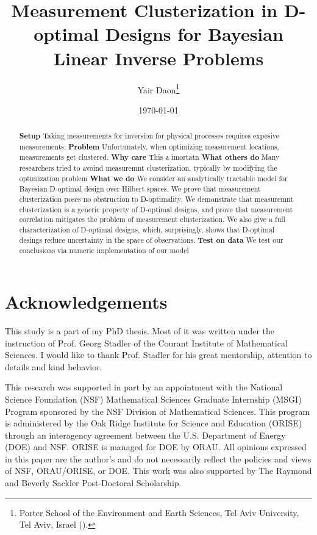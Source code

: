 \documentclass{siamonline220329}
\title{Measurement Clusterization in D-optimal Designs for Bayesian Linear
  Inverse Problems}
\author{Yair Daon\thanks{Porter School of the Environment and Earth
    Sciences, Tel Aviv University, Tel Aviv, Israel
    (\email{yair.daon@gmail.com}).}}
\date{\today}
\begin{document}
\maketitle
\begin{abstract}
  \textbf{Setup} Taking measurements for inversion for physical
  processes requires expesive measurements.  \textbf{Problem}
  Unfortunately, when optimizing measurement locations, measurements
  get clustered.  \textbf{Why care} This a imortatn \textbf{What
    others do} Many researchers tried to avoind measuremnt
  clusterization, typically by modifying the optimization problem
  \textbf{What we do} We consider an analytically tractable model for
  Bayesian D-optimal design over Hilbert spaces. We prove that
  measurement clusterization poses no obstruction to D-optimality. We
  demonstrate that measuremnt clusterization is a generic property of
  D-optimal designs, and prove that measurement correlation mitigates
  the problem of measurement clusterization. We also give a full
  characterization of D-optimal designs, which, surprisingly, shows
  that D-optimal desings reduce uncertainty in the space of
  observations.  \textbf{Test on data} We test our conclusions via
  numeric implementation of our model
\end{abstract}

\maketitle










\section{Acknowledgements}
This study is a part of my PhD thesis. Most of it was written under
the instruction of Prof. Georg Stadler of the Courant Institute of
Mathematical Sciences. I would like to thank Prof. Stadler for his
great mentorship, attention to details and kind behavior.

This research was supported in part by an appointment with the
National Science Foundation (NSF) Mathematical Sciences Graduate
Internship (MSGI) Program sponsored by the NSF Division of
Mathematical Sciences. This program is administered by the Oak Ridge
Institute for Science and Education (ORISE) through an interagency
agreement between the U.S. Department of Energy (DOE) and NSF. ORISE
is managed for DOE by ORAU. All opinions expressed in this paper are
the author's and do not necessarily reflect the policies and views of
NSF, ORAU/ORISE, or DOE.  This work was also supported by The Raymond
and Beverly Sackler Post-Doctoral Scholarship.





\end{document}
